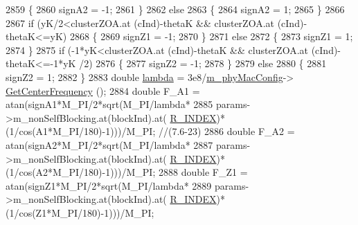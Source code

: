 \begin{DoxyCode}
2859                                 \{
2860                                         signA2 = -1;
2861                                 \}
2862                                 \textcolor{keywordflow}{else}
2863                                 \{
2864                                         signA2 = 1;
2865                                 \}
2866 
2867                                 \textcolor{keywordflow}{if} (yK/2<clusterZOA.at (cInd)-thetaK && clusterZOA.at (cInd)-thetaK<=yK)
2868                                 \{
2869                                         signZ1 = -1;
2870                                 \}
2871                                 \textcolor{keywordflow}{else}
2872                                 \{
2873                                         signZ1 = 1;
2874                                 \}
2875                                 \textcolor{keywordflow}{if} (-1*yK<clusterZOA.at (cInd)-thetaK && clusterZOA.at (cInd)-thetaK<=-1*yK
      /2)
2876                                 \{
2877                                         signZ2 = -1;
2878                                 \}
2879                                 \textcolor{keywordflow}{else}
2880                                 \{
2881                                         signZ2 = 1;
2882                                 \}
2883                                 \textcolor{keywordtype}{double} \hyperlink{loss__ITU1238_8m_aca36b09d6e71a60cfa3837d7e24c07ca}{lambda} = 3e8/\hyperlink{classns3_1_1MmWave3gppChannel_a50988766af948ea236ce24718a6dca7d}{m\_phyMacConfig}->
      \hyperlink{classns3_1_1MmWavePhyMacCommon_a0850d2e37c7075b9bce242723b722019}{GetCenterFrequency} ();
2884                                 \textcolor{keywordtype}{double} F\_A1 = atan(signA1*M\_PI/2*sqrt(M\_PI/lambda*
2885                                                 params->m\_nonSelfBlocking.at(blockInd).at(
      \hyperlink{mmwave-3gpp-channel_8h_a8f6974deb00a9a41c7352e23e76b879a}{R\_INDEX})*(1/cos(A1*M\_PI/180)-1)))/M\_PI; \textcolor{comment}{//(7.6-23)}
2886                                 \textcolor{keywordtype}{double} F\_A2 = atan(signA2*M\_PI/2*sqrt(M\_PI/lambda*
2887                                                 params->m\_nonSelfBlocking.at(blockInd).at(
      \hyperlink{mmwave-3gpp-channel_8h_a8f6974deb00a9a41c7352e23e76b879a}{R\_INDEX})*(1/cos(A2*M\_PI/180)-1)))/M\_PI;
2888                                 \textcolor{keywordtype}{double} F\_Z1 = atan(signZ1*M\_PI/2*sqrt(M\_PI/lambda*
2889                                                 params->m\_nonSelfBlocking.at(blockInd).at(
      \hyperlink{mmwave-3gpp-channel_8h_a8f6974deb00a9a41c7352e23e76b879a}{R\_INDEX})*(1/cos(Z1*M\_PI/180)-1)))/M\_PI;

\end{DoxyCode}
